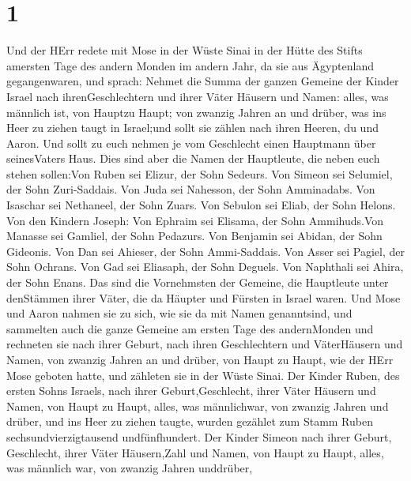 \hypertarget{section}{%
\section{1}\label{section}}

 Und der HErr redete mit Mose in der Wüste Sinai in der
Hütte des Stifts amersten Tage des andern Monden im andern Jahr, da sie
aus Ägyptenland gegangenwaren, und sprach:  Nehmet die Summa
der ganzen Gemeine der Kinder Israel nach ihrenGeschlechtern und ihrer
Väter Häusern und Namen: alles, was männlich ist, von Hauptzu Haupt;
 von zwanzig Jahren an und drüber, was ins Heer zu ziehen
taugt in Israel;und sollt sie zählen nach ihren Heeren, du und Aaron.
 Und sollt zu euch nehmen je vom Geschlecht einen Hauptmann
über seinesVaters Haus.  Dies sind aber die Namen der
Hauptleute, die neben euch stehen sollen:Von Ruben sei Elizur, der Sohn
Sedeurs.  Von Simeon sei Selumiel, der Sohn Zuri-Saddais.
 Von Juda sei Nahesson, der Sohn Amminadabs. 
Von Isaschar sei Nethaneel, der Sohn Zuars.  Von Sebulon sei
Eliab, der Sohn Helons.  Von den Kindern Joseph: Von
Ephraim sei Elisama, der Sohn Ammihuds.Von Manasse sei Gamliel, der Sohn
Pedazurs.  Von Benjamin sei Abidan, der Sohn Gideonis.
 Von Dan sei Ahieser, der Sohn Ammi-Saddais. 
Von Asser sei Pagiel, der Sohn Ochrans.  Von Gad sei
Eliasaph, der Sohn Deguels.  Von Naphthali sei Ahira, der
Sohn Enans.  Das sind die Vornehmsten der Gemeine, die
Hauptleute unter denStämmen ihrer Väter, die da Häupter und Fürsten in
Israel waren.  Und Mose und Aaron nahmen sie zu sich, wie
sie da mit Namen genanntsind,  und sammelten auch die ganze
Gemeine am ersten Tage des andernMonden und rechneten sie nach ihrer
Geburt, nach ihren Geschlechtern und VäterHäusern und Namen, von zwanzig
Jahren an und drüber, von Haupt zu Haupt,  wie der HErr
Mose geboten hatte, und zähleten sie in der Wüste Sinai. 
Der Kinder Ruben, des ersten Sohns Israels, nach ihrer
Geburt,Geschlecht, ihrer Väter Häusern und Namen, von Haupt zu Haupt,
alles, was männlichwar, von zwanzig Jahren und drüber, und ins Heer zu
ziehen taugte,  wurden gezählet zum Stamm Ruben
sechsundvierzigtausend undfünfhundert.  Der Kinder Simeon
nach ihrer Geburt, Geschlecht, ihrer Väter Häusern,Zahl und Namen, von
Haupt zu Haupt, alles, was männlich war, von zwanzig Jahren unddrüber,
